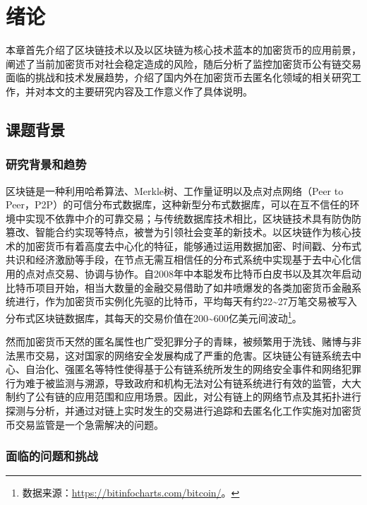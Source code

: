 \documentclass[supercite]{HustGraduPaper}
\theoremstyle{definition}
\begin{document}

\section{绪论}

本章首先介绍了区块链技术以及以区块链为核心技术蓝本的加密货币的应用前景，阐述了当前加密货币对社会稳定造成的风险，随后分析了监控加密货币公有链交易面临的挑战和技术发展趋势，介绍了国内外在加密货币去匿名化领域的相关研究工作，并对本文的主要研究内容及工作意义作了具体说明。

\subsection{课题背景}

\subsubsection{研究背景和趋势}

区块链是一种利用哈希算法、Merkle树、工作量证明以及点对点网络（Peer to Peer，P2P）的可信分布式数据库\cite{何蒲2017区块链技术与应用前瞻综述}，这种新型分布式数据库，可以在互不信任的环境中实现不依靠中介的可靠交易；与传统数据库技术相比，区块链技术具有防伪防篡改、智能合约实现等特点，被誉为引领社会变革的新技术\cite{陈伟利2018区块链数据分析}。以区块链作为核心技术的加密货币有着高度去中心化的特征，能够通过运用数据加密、时间戳、分布式共识和经济激励等手段，在节点无需互相信任的分布式系统中实现基于去中心化信用的点对点交易、协调与协作\cite{袁勇2016区块链技术发展现状与展望}。自2008年中本聪发布比特币白皮书\cite{nakamoto2008bitcoin}以及其次年启动比特币项目开始，相当大数量的金融交易借助了如井喷爆发的各类加密货币金融系统进行，作为加密货币实例化先驱的比特币，平均每天有约22\textasciitilde27万笔交易被写入分布式区块链数据库，其每天的交易价值在200\textasciitilde600亿美元间波动\footnote{数据来源：\url{https://bitinfocharts.com/bitcoin/}。}。

然而加密货币天然的匿名属性也广受犯罪分子的青睐，被频繁用于洗钱、赌博与非法黑市交易\cite{moser2013inquiry,conti2018survey}，这对国家的网络安全发展构成了严重的危害。区块链公有链系统去中心、自治化、强匿名等特性使得基于公有链系统所发生的网络安全事件和网络犯罪行为难于被监测与溯源，导致政府和机构无法对公有链系统进行有效的监管，大大制约了公有链的应用范围和应用场景。因此，对公有链上的网络节点及其拓扑进行探测与分析，并通过对链上实时发生的交易进行追踪和去匿名化工作实施对加密货币交易监管是一个急需解决的问题。

\subsubsection{面临的问题和挑战}
\end{document}
